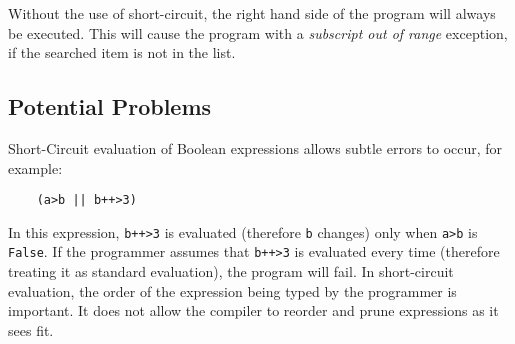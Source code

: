 Without the use of short-circuit, the right hand side of the program will always be executed. This will cause the program with a \textit{subscript out of range} exception, if the searched item is not in the list. 

\subsection{Potential Problems}
Short-Circuit evaluation of Boolean expressions allows subtle errors to occur, for example:
\begin{verbatim}
    (a>b || b++>3)    
\end{verbatim}
In this expression, \verb|b++>3| is evaluated (therefore \verb|b| changes) only when \verb|a>b| is \verb|False|. If the programmer assumes that \verb|b++>3| is evaluated every time (therefore treating it as standard evaluation), the program will fail. In short-circuit evaluation, the order of the expression being typed by the programmer is important. It does not allow the compiler to reorder and prune expressions as it sees fit.
